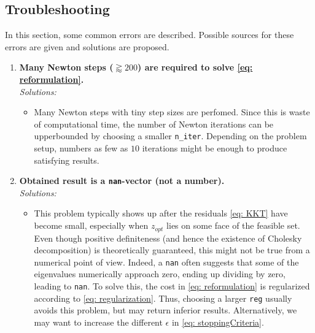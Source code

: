 \documentclass[letter]{article}
\begin{document}
\begin{sffamily}
\subsection{Troubleshooting}
In this section, some common errors are described. Possible sources for these errors are given and solutions are proposed.
\begin{enumerate}	
	\item \textbf{Many Newton steps ($\gtrapprox 200$) are required to solve \eqref{eq: reformulation}.} \\
		\emph{Solutions:}
			\begin{itemize}				
				\item Many Newton steps with tiny step sizes are perfomed. Since this is waste of computational time, the number of Newton iterations can be upperbounded by choosing a smaller \texttt{n\_iter}. Depending on the problem setup, numbers as few as $10$ iterations might be enough to produce satisfying results.
			\end{itemize}
	
	\item \textbf{Obtained result is a \texttt{nan}-vector (not a number).} \\
		\emph{Solutions:}
		\begin{itemize}
			\item This problem typically shows up after the residuals \eqref{eq: KKT} have become small, especially when $z_{opt}$ lies on some face of the feasible set. Even though positive definiteness (and hence the existence of Cholesky decomposition) is theoretically guaranteed, this might not be true from a numerical point of view. Indeed, a \texttt{nan} often suggests that some of the eigenvalues numerically approach zero, ending up dividing by zero, leading to \texttt{nan}. To solve this, the cost in \eqref{eq: reformulation} is regularized according to \eqref{eq: regularization}. Thus, choosing a larger \texttt{reg} usually avoids this problem, but may return inferior results. Alternatively, we may want to increase the different $\epsilon$ in \eqref{eq: stoppingCriteria}.
		\end{itemize}
\end{enumerate}


\end{sffamily}
\end{document}
